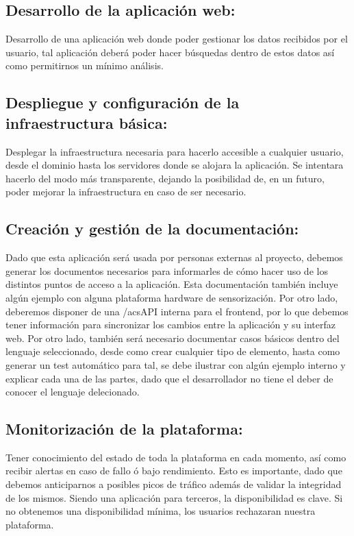 \subsection{Desarrollo de la aplicación web:} Desarrollo de una aplicación web
donde poder gestionar los datos recibidos por el usuario, tal aplicación deberá
poder hacer búsquedas dentro de estos datos así como permitirnos un mínimo
análisis.

\subsection{Despliegue y configuración de la infraestructura básica:} Desplegar
la infraestructura necesaria para hacerlo accesible a cualquier usuario, desde
el dominio hasta los servidores donde se alojara la aplicación. Se intentara
hacerlo del modo más transparente, dejando la posibilidad de, en un futuro,
poder mejorar la infraestructura en caso de ser necesario. 


\subsection{Creación y gestión de la documentación:} Dado que esta aplicación
será usada por personas externas al proyecto, debemos generar los documentos necesarios para informarles de cómo
hacer uso de los distintos puntos de acceso a la aplicación. Esta documentación
también incluye algún ejemplo con alguna plataforma hardware de
sensorización.
Por otro lado, deberemos disponer de una /acs{API} interna para el
frontend, por lo que debemos tener información para sincronizar los cambios
entre la aplicación y su interfaz web. Por otro lado, también será necesario
documentar casos básicos dentro del lenguaje seleccionado, desde como crear
cualquier tipo de elemento, hasta como generar un test automático para tal, se
debe ilustrar con algún ejemplo interno y explicar cada una de las partes, dado
que el desarrollador no tiene el deber de conocer el lenguaje delecionado.

\subsection{Monitorización de la plataforma:} Tener conocimiento del estado de toda la
plataforma en cada momento, así como recibir alertas en caso de fallo ó bajo
rendimiento. Esto es importante, dado que debemos anticiparnos a posibles picos
de tráfico además de validar la integridad de los mismos. Siendo una aplicación
para terceros, la disponibilidad es clave. Si no obtenemos una disponibilidad
mínima, los usuarios rechazaran nuestra plataforma.

